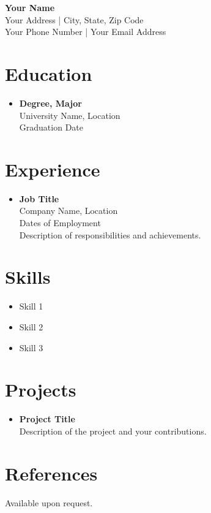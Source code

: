 \documentclass{article}
\begin{document}
\begin{center}
    \textbf{\LARGE Your Name} \\
    \vspace{5pt}
    Your Address | City, State, Zip Code \\
    Your Phone Number | Your Email Address \\
\end{center}

\section*{Education}
\begin{itemize}[leftmargin=*]
    \item \textbf{Degree, Major} \\
    University Name, Location \\
    Graduation Date
\end{itemize}

\section*{Experience}
\begin{itemize}[leftmargin=*]
    \item \textbf{Job Title} \\
    Company Name, Location \\
    Dates of Employment \\
    Description of responsibilities and achievements.
\end{itemize}

\section*{Skills}
\begin{itemize}[leftmargin=*]
    \item Skill 1
    \item Skill 2
    \item Skill 3
\end{itemize}

\section*{Projects}
\begin{itemize}[leftmargin=*]
    \item \textbf{Project Title} \\
    Description of the project and your contributions.
\end{itemize}

\section*{References}
Available upon request.
\end{document}
